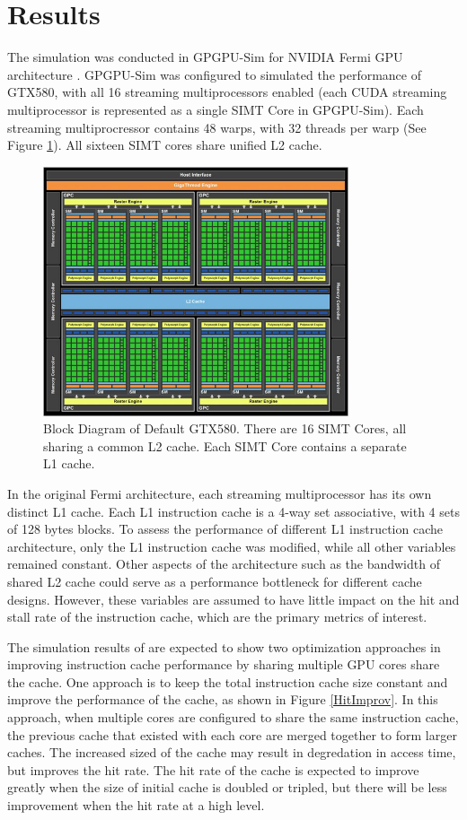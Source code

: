 \section{Results}

The simulation was conducted in GPGPU-Sim for NVIDIA Fermi GPU architecture \cite{bakhodayuan09}. GPGPU-Sim was configured to simulated the performance of GTX580, with all 16 streaming multiprocessors enabled (each CUDA streaming multiprocessor is represented as a single SIMT Core in GPGPU-Sim). Each streaming multiprocressor contains 48 warps, with 32 threads per warp (See Figure \ref{GTX580}). All sixteen SIMT cores share unified L2 cache.

\begin{figure}[ht!]
\centering
\includegraphics[width=90mm]{GTX580.jpg}
\caption{Block Diagram of Default GTX580. There are 16 SIMT Cores, all sharing a common L2 cache. Each SIMT Core contains a separate L1 cache.}
\label{GTX580}
\end{figure}

In the original Fermi architecture, each streaming multiprocessor has its own distinct L1 cache. Each L1 instruction cache is a 4-way set associative, with 4 sets of 128 bytes blocks. To assess the  performance of different L1 instruction cache architecture, only the L1 instruction cache was modified, while all other variables remained constant. Other aspects of the architecture such as the bandwidth of shared L2 cache could serve as a performance bottleneck for different cache designs. However, these variables are assumed to have little impact on the hit and stall rate of the instruction cache, which are the primary metrics of interest.

The simulation results of are expected to show two optimization approaches in improving instruction cache performance by sharing multiple GPU cores share the cache. One approach is to keep the total instruction cache size constant and improve the performance of the cache, as shown in Figure \ref{HitImprov}. In this approach, when multiple cores are configured to share the same instruction cache, the previous cache that existed with each core are merged together to form larger caches. The increased sized of the cache may result in degredation in access time, but improves the hit rate. The hit rate of the cache is expected to improve greatly when the size of initial cache is doubled or tripled, but there will be less improvement when the hit rate at a high level.

